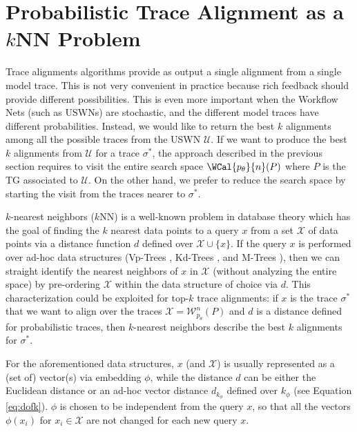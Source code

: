 
\section{Probabilistic Trace Alignment as a $k$NN Problem}\label{sec:topk}
Trace alignments algorithms provide as output a single alignment from a single model trace. This is not very convenient in practice because rich feedback should provide different possibilities. This is even more important when the Workflow Nets (such as USWNs) are stochastic, and the different model traces have different probabilities. {Instead, we would like to return the best $k$ alignments among all the possible \unravelled traces from the USWN $\mathcal{U}$. If we want to produce the best $k$ alignments from $\mathcal{U}$ for a trace $\sigma^*$, the approach described in the previous section requires to visit the entire search space $\WCal{p_\theta}{n}(P)$ where $P$ is the TG associated to $\mathcal{U}$. On the other hand, we prefer to reduce the search space by starting the visit from the traces nearer to $\sigma^*$.}



$k$-nearest neighbors ($k$NN) is a well-known problem in database theory \cite{Altman} which has the goal of finding the $k$ nearest data points to a query $x$ from a set $\mathcal{X}$ of data points via a distance function $d$ defined over $\mathcal{X}\cup\{x\}$. {If the query  $x$ is performed over ad-hoc data structures (Vp-Trees \cite{Fu2000}, Kd-Trees \cite{Maneewongvatana99}, and M-Trees \cite{Ciaccia}), then we can straight identify the nearest neighbors of $x$ in $\mathcal{X}$ (without analyzing the entire space) by pre-ordering $\mathcal{X}$ within the data structure of choice via $d$. This characterization could be exploited for top-$k$ trace alignments: if $x$ is the trace $\sigma^*$ that we want to align over the \unravelled traces $\mathcal{X}=\mathcal{W}^n_{p_\theta}(P)$ and $d$ is a distance defined for probabilistic traces, then $k$-nearest neighbors describe the best $k$ alignments for $\sigma^*$.}
	
{For the aforementioned data structures, $x$ (and $\mathcal{X}$) is usually represented as a (set of) vector(s) via embedding  $\phi$, while the distance $d$ can be either the Euclidean distance or an ad-hoc vector distance $d_{k_\phi}$ defined over $k_\phi$ (see Equation \ref{eq:dofk}). $\phi$ is chosen to be independent from the query $x$, so that all the vectors $\phi(x_i)$ for $x_i\in\mathcal{X}$ are not changed for each new query $x$.}


